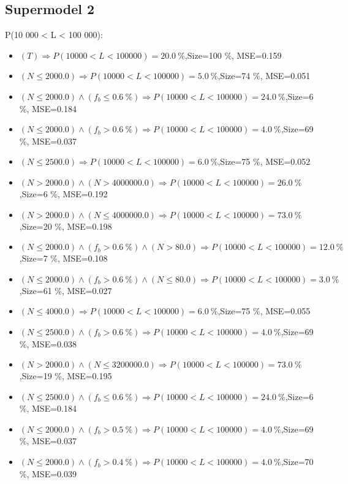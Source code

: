 \documentclass[numbered]{CSL}
\begin{document}
\subsection{Supermodel 2}
P(10 000 < L < 100 000):
\begin{itemize}
\item $(T) \Rightarrow P(10 000 < L < 100 000) = 20.0~\%$,\hfill Size=100 \%, MSE=0.159
\item $(N \leq 2000.0) \Rightarrow P(10 000 < L < 100 000) = 5.0~\%$,\hfill Size=74 \%, MSE=0.051
\item $(N \leq 2000.0) \land (f_b \leq 0.6~\%) \Rightarrow P(10 000 < L < 100 000) = 24.0~\%$,\hfill Size=6 \%, MSE=0.184
\item $(N \leq 2000.0) \land (f_b > 0.6~\%) \Rightarrow P(10 000 < L < 100 000) = 4.0~\%$,\hfill Size=69 \%, MSE=0.037
\item $(N \leq 2500.0) \Rightarrow P(10 000 < L < 100 000) = 6.0~\%$,\hfill Size=75 \%, MSE=0.052
\item $(N > 2000.0) \land (N > 4000000.0) \Rightarrow P(10 000 < L < 100 000) = 26.0~\%$,\hfill Size=6 \%, MSE=0.192
\item $(N > 2000.0) \land (N \leq 4000000.0) \Rightarrow P(10 000 < L < 100 000) = 73.0~\%$,\hfill Size=20 \%, MSE=0.198
\item $(N \leq 2000.0) \land (f_b > 0.6~\%) \land (N > 80.0) \Rightarrow P(10 000 < L < 100 000) = 12.0~\%$,\hfill Size=7 \%, MSE=0.108
\item $(N \leq 2000.0) \land (f_b > 0.6~\%) \land (N \leq 80.0) \Rightarrow P(10 000 < L < 100 000) = 3.0~\%$,\hfill Size=61 \%, MSE=0.027
\item $(N \leq 4000.0) \Rightarrow P(10 000 < L < 100 000) = 6.0~\%$,\hfill Size=75 \%, MSE=0.055
\item $(N \leq 2500.0) \land (f_b > 0.6~\%) \Rightarrow P(10 000 < L < 100 000) = 4.0~\%$,\hfill Size=69 \%, MSE=0.038
\item $(N > 2000.0) \land (N \leq 3200000.0) \Rightarrow P(10 000 < L < 100 000) = 73.0~\%$,\hfill Size=19 \%, MSE=0.195
\item $(N \leq 2500.0) \land (f_b \leq 0.6~\%) \Rightarrow P(10 000 < L < 100 000) = 24.0~\%$,\hfill Size=6 \%, MSE=0.184
\item $(N \leq 2000.0) \land (f_b > 0.5~\%) \Rightarrow P(10 000 < L < 100 000) = 4.0~\%$,\hfill Size=69 \%, MSE=0.037
\item $(N \leq 2000.0) \land (f_b > 0.4~\%) \Rightarrow P(10 000 < L < 100 000) = 4.0~\%$,\hfill Size=70 \%, MSE=0.039

\end{itemize}
\end{document}
